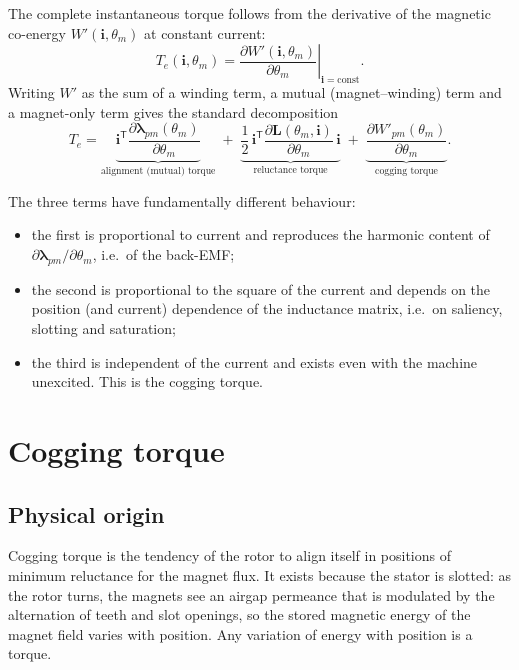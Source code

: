 \documentclass[11pt,a4paper]{article}
\newcommand{\thetam}{\theta_{m}}
\begin{document}
The complete instantaneous torque follows from the derivative of the magnetic
co-energy $W'(\mathbf{i},\thetam)$ at constant current:
\begin{equation}
T_{e}(\mathbf{i},\thetam) = \left.\frac{\partial W'(\mathbf{i},\thetam)}{\partial \thetam}\right|_{\mathbf{i}=\text{const}} .
\end{equation}
Writing $W'$ as the sum of a winding term, a mutual (magnet--winding) term and
a magnet-only term gives the standard decomposition
\begin{equation}
T_{e} = \underbrace{\mathbf{i}^{\mathsf{T}}\frac{\partial \boldsymbol{\lambda}_{pm}(\thetam)}{\partial \thetam}}_{\text{alignment (mutual) torque}}
\; + \;
\underbrace{\frac{1}{2}\,\mathbf{i}^{\mathsf{T}}\frac{\partial \mathbf{L}(\thetam,\mathbf{i})}{\partial \thetam}\,\mathbf{i}}_{\text{reluctance torque}}
\; + \;
\underbrace{\frac{\partial W'_{pm}(\thetam)}{\partial \thetam}}_{\text{cogging torque}} .
\label{eq:decomp}
\end{equation}

The three terms have fundamentally different behaviour:

\begin{itemize}
\item the first is proportional to current and reproduces the harmonic content
      of $\partial\boldsymbol{\lambda}_{pm}/\partial\thetam$, i.e.\ of the back-EMF;
\item the second is proportional to the square of the current and depends on
      the position (and current) dependence of the inductance matrix, i.e.\ on
      saliency, slotting and saturation;
\item the third is independent of the current and exists even with the machine
      unexcited. This is the cogging torque.
\end{itemize}

\section{Cogging torque}
\label{sec:cogging}

\subsection{Physical origin}

Cogging torque is the tendency of the rotor to align itself in positions of
minimum reluctance for the magnet flux. It exists because the stator is
slotted: as the rotor turns, the magnets see an airgap permeance that is
modulated by the alternation of teeth and slot openings, so the stored magnetic
energy of the magnet field varies with position. Any variation of energy with
position is a torque.
\end{document}
